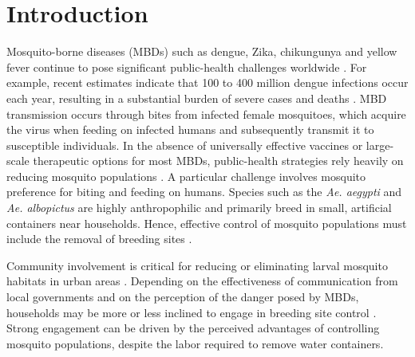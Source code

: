 \documentclass{article}
\theoremstyle{remark}
\theoremstyle{custom} %
\begin{document}
\parskip=6pt


\section{Introduction}



Mosquito-borne diseases (MBDs) such as dengue, Zika, chikungunya and yellow fever continue to pose significant public-health challenges worldwide \cite{CDC_deadliest_animal}. For example, recent estimates indicate that 100 to 400 million dengue infections occur each year, resulting in a substantial burden of severe cases and deaths \cite{who2024dengue}. MBD transmission occurs through bites from infected female mosquitoes, which acquire the virus when feeding on infected humans and subsequently transmit it to susceptible individuals. In the absence of universally effective vaccines or large-scale therapeutic options for most MBDs, public-health strategies rely heavily on reducing mosquito populations \cite{wilson2020importance}. A particular challenge involves mosquito preference for biting and feeding on humans. Species such as the \emph{Ae. aegypti} and \emph{Ae. albopictus}  are highly anthropophilic and primarily breed in small, artificial containers near households. Hence, effective control of mosquito populations must include the removal of breeding sites \cite{gubler2011dengue,wong2011oviposition,buhler2019environmental}.

 

Community involvement is critical for reducing or eliminating larval mosquito habitats in urban areas \cite{WHO_engaging_communities_dengue}. Depending on the effectiveness of communication from local governments and on the perception of the danger posed by MBDs, households may be more or less inclined to engage in breeding site control \cite{raude2012public,dussault2022arbovirus}. Strong engagement can be driven by the perceived advantages of controlling mosquito populations, despite the labor required to remove water containers. 
\end{document}
